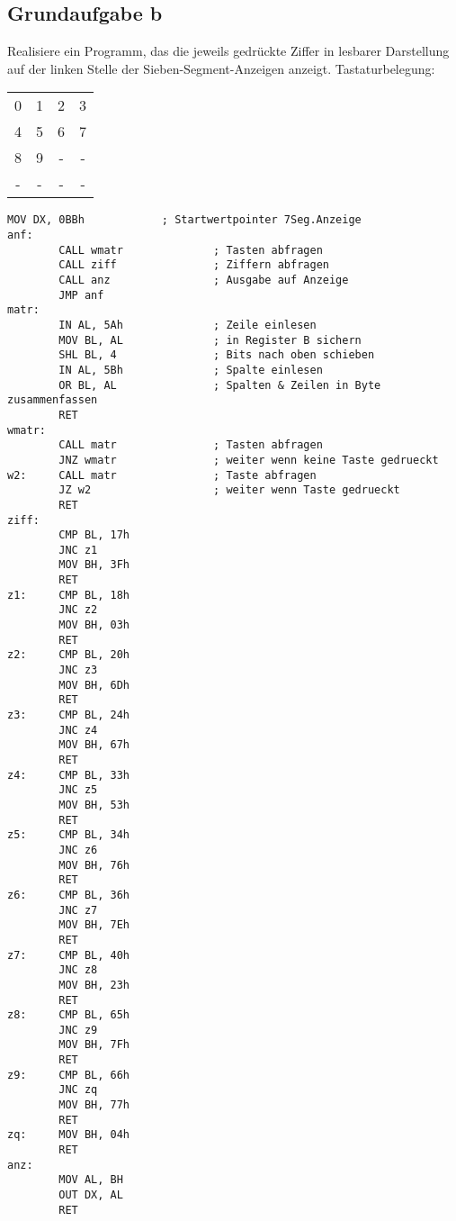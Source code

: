 \documentclass[a4paper,10pt,titlepage]{scrartcl}
\begin{document}
\subsection*{Grundaufgabe b}
\begin{multicols}{2}
Realisiere ein Programm, das die jeweils gedrückte Ziffer in lesbarer Darstellung auf der linken Stelle der Sieben-Segment-Anzeigen anzeigt.
Tastaturbelegung:

\begin{center}
        \begin{tabular}{c|c|c|c}
                0 & 1 & 2 & 3 \\
                4 & 5 & 6 & 7 \\
                8 & 9 & - & - \\
                - & - & - & -
        \end{tabular}
\end{center}
\end{multicols}

\begin{lstlisting}[caption=aufgabe 3b]
        MOV DX, 0BBh            ; Startwertpointer 7Seg.Anzeige
anf:
        CALL wmatr              ; Tasten abfragen
        CALL ziff               ; Ziffern abfragen
        CALL anz                ; Ausgabe auf Anzeige
        JMP anf
matr:
        IN AL, 5Ah              ; Zeile einlesen
        MOV BL, AL              ; in Register B sichern
        SHL BL, 4               ; Bits nach oben schieben
        IN AL, 5Bh              ; Spalte einlesen
        OR BL, AL               ; Spalten & Zeilen in Byte zusammenfassen
        RET
wmatr:
        CALL matr               ; Tasten abfragen
        JNZ wmatr               ; weiter wenn keine Taste gedrueckt
w2:     CALL matr               ; Taste abfragen
        JZ w2                   ; weiter wenn Taste gedrueckt
        RET
ziff:
        CMP BL, 17h
        JNC z1
        MOV BH, 3Fh
        RET
z1:     CMP BL, 18h
        JNC z2
        MOV BH, 03h
        RET
z2:     CMP BL, 20h
        JNC z3
        MOV BH, 6Dh
        RET
z3:     CMP BL, 24h
        JNC z4
        MOV BH, 67h
        RET
z4:     CMP BL, 33h
        JNC z5
        MOV BH, 53h
        RET
z5:     CMP BL, 34h
        JNC z6
        MOV BH, 76h
        RET
z6:     CMP BL, 36h
        JNC z7
        MOV BH, 7Eh
        RET
z7:     CMP BL, 40h
        JNC z8
        MOV BH, 23h
        RET
z8:     CMP BL, 65h
        JNC z9
        MOV BH, 7Fh
        RET
z9:     CMP BL, 66h
        JNC zq
        MOV BH, 77h
        RET
zq:     MOV BH, 04h
        RET
anz:
        MOV AL, BH
        OUT DX, AL
        RET
\end{lstlisting}
\end{document}
